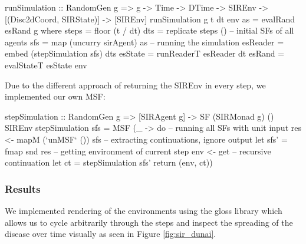 \begin{HaskellCode}
runSimulation :: RandomGen g => g -> Time -> DTime 
  -> SIREnv -> [(Disc2dCoord, SIRState)] -> [SIREnv]
runSimulation g t dt env as = evalRand esRand g
  where
    steps    = floor (t / dt)
    dts      = replicate steps ()
    -- initial SFs of all agents
    sfs      = map (uncurry sirAgent) as   
    -- running the simulation   
    esReader = embed (stepSimulation sfs) dts 
    esState  = runReaderT esReader dt 
    esRand   = evalStateT esState env     
\end{HaskellCode}

Due to the different approach of returning the SIREnv in every step, we implemented our own MSF:
\begin{HaskellCode}
stepSimulation :: RandomGen g 
  => [SIRAgent g] -> SF (SIRMonad g) () SIREnv
stepSimulation sfs = MSF (\_ -> do
  -- running all SFs with unit input
  res <- mapM (`unMSF` ()) sfs
  -- extracting continuations, ignore output
  let sfs' = fmap snd res
  -- getting environment of current step   
  env <- get
  -- recursive continuation    
  let ct = stepSimulation sfs'  
  return (env, ct))
\end{HaskellCode}

\subsubsection{Results}
We implemented rendering of the environments using the gloss library which allows us to cycle arbitrarily through the steps and inspect the spreading of the disease over time visually as seen in Figure \ref{fig:sir_dunai}.

